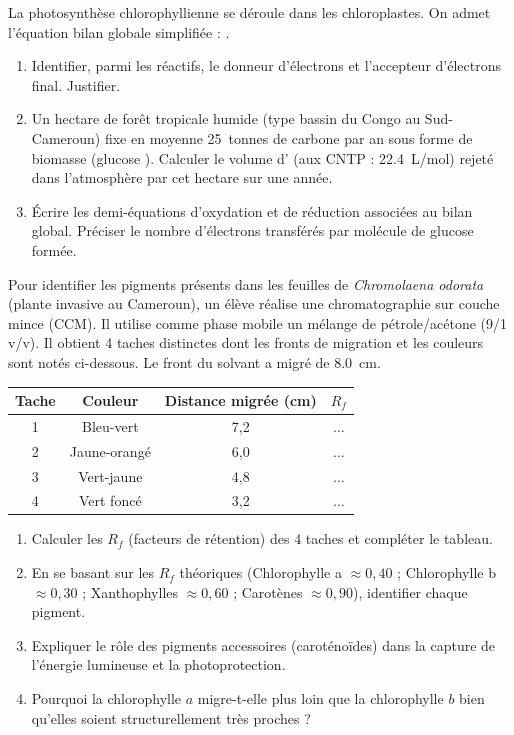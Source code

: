 \documentclass[11pt]{article}
\begin{document}
\begin{exercice}
La photosynthèse chlorophyllienne se déroule dans les chloroplastes. On admet l'équation bilan globale simplifiée :
.

\begin{enumerate}
    \item Identifier, parmi les réactifs, le donneur d'électrons et l'accepteur d'électrons final. Justifier.
    \item Un hectare de forêt tropicale humide (type bassin du Congo au Sud-Cameroun) fixe en moyenne \SI{25}{tonnes} de carbone par an sous forme de biomasse (glucose ). Calculer le volume d' (aux CNTP : \SI{22,4}{L/mol}) rejeté dans l'atmosphère par cet hectare sur une année.
    \item Écrire les demi-équations d'oxydation et de réduction associées au bilan global. Préciser le nombre d'électrons transférés par molécule de glucose formée.
\end{enumerate}
\end{exercice}

\begin{exercice}
Pour identifier les pigments présents dans les feuilles de \textit{Chromolaena odorata} (plante invasive au Cameroun), un élève réalise une chromatographie sur couche mince (CCM). Il utilise comme phase mobile un mélange de pétrole/acétone (9/1 v/v). Il obtient 4 taches distinctes dont les fronts de migration et les couleurs sont notés ci-dessous. Le front du solvant a migré de \SI{8,0}{cm}.

\begin{center}
\begin{tabular}{|c|c|c|c|}
\hline
Tache & Couleur & Distance migrée (cm) & $R_f$ \\
\hline
1 & Bleu-vert & 7,2 & ... \\
2 & Jaune-orangé & 6,0 & ... \\
3 & Vert-jaune & 4,8 & ... \\
4 & Vert foncé & 3,2 & ... \\
\hline
\end{tabular}
\end{center}

\begin{enumerate}
    \item Calculer les $R_f$ (facteurs de rétention) des 4 taches et compléter le tableau.
    \item En se basant sur les $R_f$ théoriques (Chlorophylle a $\approx 0,40$ ; Chlorophylle b $\approx 0,30$ ; Xanthophylles $\approx 0,60$ ; Carotènes $\approx 0,90$), identifier chaque pigment.
    \item Expliquer le rôle des pigments accessoires (caroténoïdes) dans la capture de l'énergie lumineuse et la photoprotection.
    \item Pourquoi la chlorophylle $a$ migre-t-elle plus loin que la chlorophylle $b$ bien qu'elles soient structurellement très proches ?
\end{enumerate}
\end{exercice}
\end{document}
